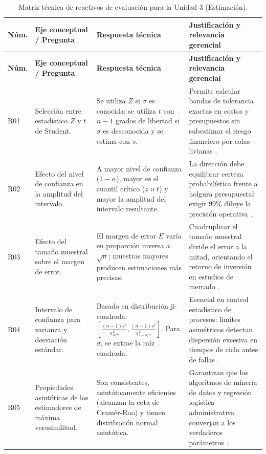 {\begin{center}
\renewcommand{\arraystretch}{1.22}
\begin{longtable}{p{1.1cm}p{4.2cm}p{4.3cm}p{4.8cm}}
\caption{Matriz técnica de reactivos de evaluación para la Unidad 3 (Estimación).}\label{tab:cuestionario}\\
\toprule
\textbf{Núm.} & \textbf{Eje conceptual / Pregunta} & \textbf{Respuesta técnica} & \textbf{Justificación y relevancia gerencial} \\
\midrule
\endfirsthead
\toprule
\textbf{Núm.} & \textbf{Eje conceptual / Pregunta} & \textbf{Respuesta técnica} & \textbf{Justificación y relevancia gerencial} \\
\midrule
\endhead
\bottomrule
\endfoot
R01 & Selección entre estadístico $Z$ y $t$ de Student. & Se utiliza $Z$ si $\sigma$ es conocida; se utiliza $t$ con $n-1$ grados de libertad si $\sigma$ es desconocida y se estima con $s$. & Permite calcular bandas de tolerancia exactas en costos y presupuestos sin subestimar el riesgo financiero por colas livianas \citep{anderson2012}. \\
\midrule
R02 & Efecto del nivel de confianza en la amplitud del intervalo. & A mayor nivel de confianza ($1-\alpha$), mayor es el cuantil crítico ($z$ o $t$) y mayor la amplitud del intervalo resultante. & La dirección debe equilibrar certeza probabilística frente a holgura presupuestal: exigir 99\% diluye la precisión operativa \citep{lind2012}. \\
\midrule
R03 & Efecto del tamaño muestral sobre el margen de error. & El margen de error $E$ varía en proporción inversa a $\sqrt{n}$; muestras mayores producen estimaciones más precisas. & Cuadruplicar el tamaño muestral divide el error a la mitad, orientando el retorno de inversión en estudios de mercado \citep{holmesBusiness2023}. \\
\midrule
R04 & Intervalo de confianza para varianza y desviación estándar. & Basado en distribución ji-cuadrada: $\left[\frac{(n-1)s^2}{\chi^2_{\alpha/2}}, \frac{(n-1)s^2}{\chi^2_{1-\alpha/2}}\right]$. Para $\sigma$, se extrae la raíz cuadrada. & Esencial en control estadístico de procesos: límites asimétricos detectan dispersión excesiva en tiempos de ciclo antes de fallas \citep{canavos1988}. \\
\midrule
R05 & Propiedades asintóticas de los estimadores de máxima verosimilitud. & Son consistentes, asintóticamente eficientes (alcanzan la cota de Cramér-Rao) y tienen distribución normal asintótica. & Garantizan que los algoritmos de minería de datos y regresión logística administrativa converjan a los verdaderos parámetros \citep{wackerly2010}. \\

\end{longtable}
\end{center}}
